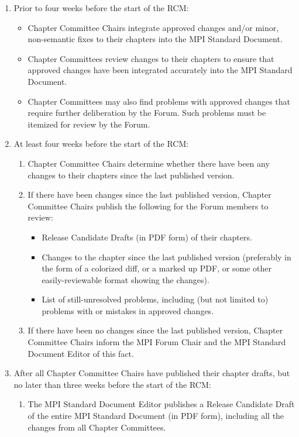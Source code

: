 \begin{enumerate}
\item Prior to four weeks before the start of the RCM:
  \begin{itemize}
  \item Chapter Committee Chairs integrate approved changes and/or
    minor, non-semantic fixes to their chapters into the MPI Standard
    Document.
  \item Chapter Committees review changes to their chapters to ensure
    that approved changes have been integrated accurately into the MPI
    Standard Document.
  \item Chapter Committees may also find problems with approved
    changes that require further deliberation by the Forum.  Such
    problems must be itemized for review by the Forum.
  \end{itemize}

\item At least four weeks before the start of the RCM:
  \begin{enumerate}
  \item Chapter Committee Chairs determine whether there have been
    any changes to their chapters since the last published version.
  \item If there have been changes since the last published version,
    Chapter Committee Chairs publish the following for the Forum
    members to review:
    \begin{itemize}
      \item Release Candidate Drafts (in PDF form) of their chapters.
      \item Changes to the chapter since the last published version
        (preferably in the form of a colorized diff, or a marked up
        PDF, or some other easily-reviewable format showing the
        changes).
      \item List of still-unresolved problems, including (but not
        limited to) problems with or mistakes in approved changes.
    \end{itemize}
  \item If there have been no changes since the last
    published version, Chapter Committee Chairs inform the MPI Forum
    Chair and the MPI Standard Document Editor of this fact.
  \end{enumerate}

\item After all Chapter Committee Chairs have published their chapter
  drafts, but no later than three weeks before the start of the RCM:
  \begin{enumerate}
  \item The MPI Standard Document Editor publishes a Release Candidate
    Draft of the entire MPI Standard Document (in PDF form), including
    all the changes from all Chapter Committees.
  \end{enumerate}


\end{enumerate}
